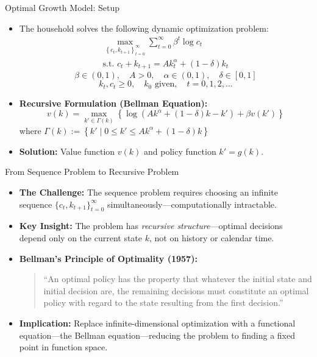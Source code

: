 \begin{frame}{Optimal Growth Model: Setup}
\begin{itemize}
\item The household solves the following dynamic optimization problem:
\begin{gather*}
\max_{\left\{ c_{t},k_{t+1}\right\} _{t=0}^{\infty}}\sum_{t=0}^{\infty}\beta^{t}\log c_{t} \\
\text{s.t. } c_{t}+k_{t+1}=Ak_{t}^{\alpha}+(1-\delta)k_{t}
\end{gather*}
\[
\beta\in(0,1),\quad A>0,\quad \alpha\in(0,1),\quad \delta\in[0,1]
\]
\[
k_{t}, c_{t}\geq0,\quad k_{0}\text{ given}, \quad t=0,1,2,\dots
\]
\item \textbf{Recursive Formulation (Bellman Equation):}
\[
v(k)=\max_{k' \in \Gamma(k)}\left\{ \log\left(Ak^{\alpha}+(1-\delta)k - k'\right)+\beta v(k') \right\}
\]
where $\Gamma(k) := \left\{ k' \mid 0 \leq k' \leq Ak^{\alpha}+(1-\delta)k \right\}$
\item \textbf{Solution:} Value function $v(k)$ and policy function $k'=g(k)$.
\end{itemize}
\end{frame}

\begin{frame}{From Sequence Problem to Recursive Problem}
\begin{itemize}
\item \textbf{The Challenge:} The sequence problem requires choosing an infinite sequence $\{c_t, k_{t+1}\}_{t=0}^{\infty}$ simultaneously---computationally intractable.

\medskip
\item \textbf{Key Insight:} The problem has \emph{recursive structure}---optimal decisions depend only on the current state $k$, not on history or calendar time.

\medskip
\item \textbf{Bellman's Principle of Optimality (1957):}
\begin{quote}
``An optimal policy has the property that whatever the initial state and initial decision are, the remaining decisions must constitute an optimal policy with regard to the state resulting from the first decision.''
\end{quote}

\medskip
\item \textbf{Implication:} Replace infinite-dimensional optimization with a functional equation---the Bellman equation---reducing the problem to finding a fixed point in function space.
\end{itemize}
\end{frame}

